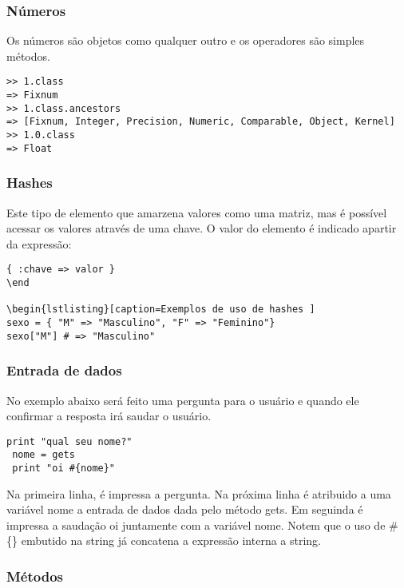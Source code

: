 \documentclass[12pt]{article}
\begin{document}
\subsubsection { Números }

Os números são objetos como qualquer outro e os operadores são simples métodos.

\begin{lstlisting}[caption=Exemplos de uso de números ]
>> 1.class
=> Fixnum
>> 1.class.ancestors
=> [Fixnum, Integer, Precision, Numeric, Comparable, Object, Kernel]
>> 1.0.class
=> Float
\end{lstlisting}

\subsubsection { Hashes }

Este tipo de elemento que amarzena valores como uma matriz, mas é possível acessar os valores através de uma chave. O valor do elemento é indicado apartir da expressão:

\begin{lstlisting}[caption=Syntaxe do hash ]
{ :chave => valor }
\end

\begin{lstlisting}[caption=Exemplos de uso de hashes ]
sexo = { "M" => "Masculino", "F" => "Feminino"}
sexo["M"] # => "Masculino"
\end{lstlisting}

\subsubsection { Entrada de dados }

No exemplo abaixo será feito uma pergunta para o usuário e quando ele confirmar a resposta irá saudar o usuário.

\begin{lstlisting}[caption=Exemplo de entrada de dados ]
 print "qual seu nome?"
 nome = gets
 print "oi #{nome}"
\end{lstlisting}
 
Na primeira linha, é impressa a pergunta. Na próxima linha é atribuido a uma variável nome a entrada de dados dada pelo método gets.
Em seguinda é impressa a saudação oi juntamente com a variável nome. Notem que o uso de \#\{\} embutido na string já concatena a expressão interna a string.

\subsubsection { Métodos }
\end{document}
